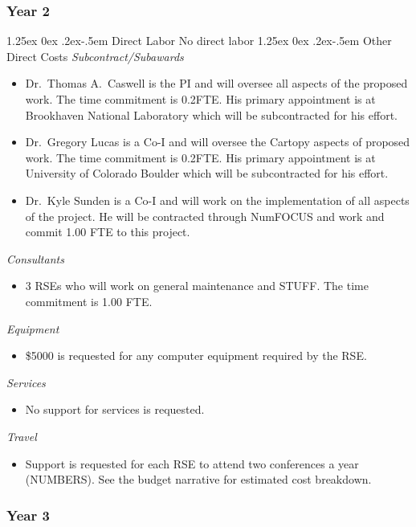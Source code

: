 \documentclass[12pt]{article}
\makeatletter
\numberwithin{page}{section}
\renewcommand{\paragraph}{%
  \@startsection{paragraph}{4}%
  {\z@}{1.25ex \@plus 0ex \@minus .2ex}{-.5em}%
  {\normalfont\normalsize\itshape\bfseries}%
}
\makeatother
\begin{document}
\subsubsection{Year 2}
\paragraph{Direct Labor}
No direct labor
\paragraph{Other Direct Costs}
\textit{Subcontract/Subawards}
\begin{itemize}
  \item Dr.\ Thomas A.\ Caswell is the PI and will oversee all aspects of the
  proposed work.  The time commitment is 0.2FTE.  His primary
  appointment is at Brookhaven National Laboratory which will be
  subcontracted for his effort.
\item Dr.\ Gregory Lucas is a Co-I and will oversee the Cartopy aspects of
  proposed work.  The time commitment is 0.2FTE.  His primary appointment is at
  University of Colorado Boulder which will be subcontracted for his effort.
\item Dr.\ Kyle Sunden is a Co-I and will work on the implementation of all
  aspects of the project.  He will be contracted through NumFOCUS and work and
  commit 1.00 FTE to this project.
\end{itemize}
\textit{Consultants}
\begin{itemize}
\item 3 RSEs who will work on general maintenance and STUFF.  The time commitment is 1.00
  FTE.
\end{itemize}
\textit{Equipment}
\begin{itemize}
\item \$5000 is requested for any computer equipment required by the RSE.
\end{itemize}
\textit{Services}
\begin{itemize}
\item No support for services is requested.
\end{itemize}
\textit{Travel}
\begin{itemize}
\item Support is requested for each RSE to attend two conferences a
  year (NUMBERS).  See the budget narrative for estimated cost
  breakdown.
\end{itemize}
\subsubsection{Year 3}
\end{document}
